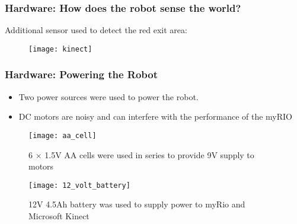 \documentclass[aspectratio=169]{beamer}
\begin{document}

\begin{frame}
\frametitle{Hardware: How does the robot sense the world?}
Additional sensor used to detect the red exit area:
\begin{figure}
\centering
\texttt{[image: kinect]}
\end{figure}
\end{frame}


\begin{frame}
\frametitle{Hardware: Powering the Robot}
\begin{itemize}
\item Two power sources were used to power the robot.
\item DC motors are noisy and can interfere with the performance of the myRIO 
\end{itemize}
\begin{minipage}{0.45\textwidth}
\begin{figure}
\centering
\texttt{[image: aa\_cell]}
\caption{6 $\times$ 1.5V AA cells were used in series to provide 9V supply to motors}
\end{figure}
\end{minipage}
\hspace{1cm}
\begin{minipage}{0.45\textwidth}
\begin{figure}
\texttt{[image: 12\_volt\_battery]}
\caption{12V 4.5Ah battery was used to supply power to myRio and Microsoft Kinect}
\end{figure}
\end{minipage}
\end{frame}

\end{document}
